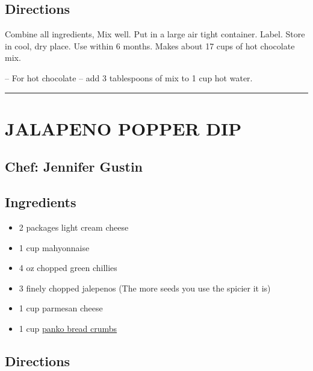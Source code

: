 \documentclass[
]{book}
\providecommand{\tightlist}{%
  \setlength{\itemsep}{0pt}\setlength{\parskip}{0pt}}
\begin{document}
\hypertarget{directions-7}{%
\subsection*{Directions}\label{directions-7}}


Combine all ingredients, Mix well. Put in a large air tight container.
Label. Store in cool, dry place. Use within 6 months. Makes about 17 cups of hot chocolate mix.

-- For hot chocolate -- add 3 tablespoons of mix to 1 cup hot water.

\begin{center}\rule{0.5\linewidth}{0.5pt}\end{center}

\hypertarget{jalapeno-popper-dip}{%
\section*{JALAPENO POPPER DIP}\label{jalapeno-popper-dip}}


\hypertarget{chef-jennifer-gustin-2}{%
\subsection*{Chef: Jennifer Gustin}\label{chef-jennifer-gustin-2}}


\hypertarget{ingredients-8}{%
\subsection*{Ingredients}\label{ingredients-8}}


\begin{itemize}
\tightlist
\item
  2 packages light cream cheese
\item
  1 cup mahyonnaise
\item
  4 oz chopped green chillies
\item
  3 finely chopped jalepenos (The more seeds you use the spicier it is)
\item
  1 cup parmesan cheese
\item
  1 cup \href{https://en.wikipedia.org/wiki/Bread_crumbs\#Panko}{panko bread crumbs}
\end{itemize}

\hypertarget{directions-8}{%
\subsection*{Directions}\label{directions-8}}
\end{document}
